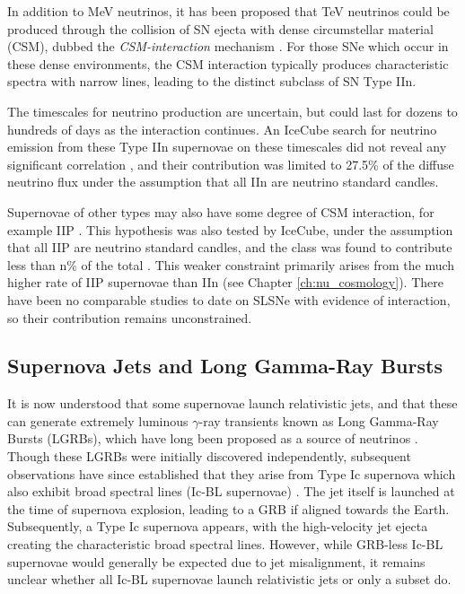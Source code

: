 In addition to MeV neutrinos, it has been proposed that TeV neutrinos could be produced through the collision of SN ejecta with dense circumstellar material (CSM), dubbed the \emph{CSM-interaction} mechanism . For those SNe which occur in these dense environments, the CSM interaction typically produces characteristic spectra with narrow lines, leading to the distinct subclass of SN Type IIn. 

The timescales for neutrino production are uncertain, but could last for dozens to hundreds of days as the interaction continues. An IceCube search for neutrino emission from these Type IIn supernovae on these timescales did not reveal any significant correlation , and their contribution was limited to 27.5\%  of the diffuse neutrino flux under the assumption that all IIn are neutrino standard candles. 

Supernovae of other types may also have some degree of CSM interaction, for example IIP . This hypothesis was also tested by IceCube, under the assumption that all IIP are neutrino standard candles, and the class was found to contribute less than n\% of the total \cite{Stasik2018Search}. This weaker constraint primarily arises from the much higher rate of IIP supernovae than IIn (see Chapter \ref{ch:nu_cosmology}). There have been no comparable studies to date on SLSNe with evidence of interaction, so their contribution remains unconstrained.

\subsection*{Supernova Jets and Long Gamma-Ray Bursts}

It is now understood that some supernovae launch relativistic jets, and that these can generate extremely luminous $\gamma$-ray transients known as Long Gamma-Ray Bursts (LGRBs), which have long been proposed as a source of neutrinos . Though these LGRBs were initially discovered independently, subsequent observations have since established that they arise from Type Ic supernova which also exhibit broad spectral lines (Ic-BL supernovae) . The jet itself is launched at the time of supernova explosion, leading to a GRB if aligned towards the Earth. Subsequently, a Type Ic supernova appears, with the high-velocity jet ejecta creating the characteristic broad spectral lines. However, while GRB-less Ic-BL supernovae would generally be expected due to jet misalignment, it remains unclear whether all Ic-BL supernovae launch relativistic jets or only a subset do.

